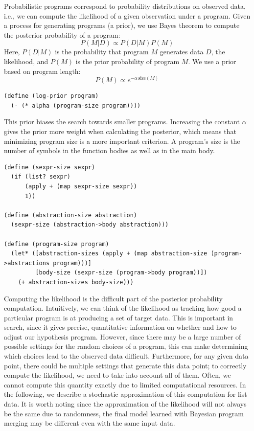 \documentclass[a4paper,10pt]{article}
\begin{document}
Probabilistic programs correspond to probability distributions on observed data, i.e., we can compute the likelihood of a given observation under a program. Given a process for generating programs (a prior), we use Bayes theorem to compute the posterior probability of a program:
\begin{equation}P(M|D)\propto P(D|M)P(M)\end{equation}
Here, $P(D|M)$ is the probability that program $M$ generates data $D$, the likelihood, and $P(M)$ is the prior probability of program $M$. We use a prior based on program length:
\begin{equation}P(M)\propto e^{-\alpha \, \mathrm{size}(M)}\end{equation}
\begin{lstlisting}[frame=trbl]
(define (log-prior program)
  (- (* alpha (program-size program))))
\end{lstlisting}
This prior biases the search towards smaller programs. Increasing the constant $\alpha$ gives the prior more weight when calculating the posterior, which means that minimizing program size is a more important criterion. A program's size is the number of symbols in the function bodies as well as in the main body.
\begin{lstlisting}[frame=trbl]
(define (sexpr-size sexpr)
  (if (list? sexpr)
      (apply + (map sexpr-size sexpr))
      1))

(define (abstraction-size abstraction)
  (sexpr-size (abstraction->body abstraction)))
  
(define (program-size program)
  (let* ([abstraction-sizes (apply + (map abstraction-size (program->abstractions program)))]
         [body-size (sexpr-size (program->body program))])
    (+ abstraction-sizes body-size)))
\end{lstlisting}
Computing the likelihood is the difficult part of the posterior probability computation. Intuitively, we can think of the likelihood as tracking how good a particular program is at producing a set of target data.  This is important in search, since it gives precise, quantitative information on whether and how to adjust our hypothesis program. However, since there may be a large number of possible settings for the random choices of a program, this can make determining which choices lead to the observed data difficult. Furthermore, for any given data point, there could be multiple settings that generate this data point; to correctly compute the likelihood, we need to take into account all of them. Often, we cannot compute this quantity exactly due to limited computational resources.  In the following, we describe a stochastic approximation of this computation for list data.  It is worth noting since the approximation of the likelihood will not always be the same due to randomness, the final model learned with Bayesian program merging may be different even with the same input data.
\end{document}
